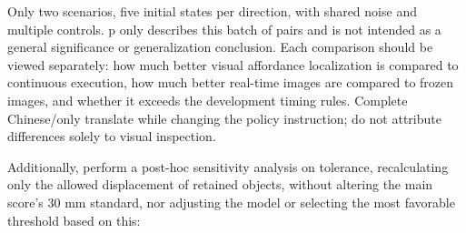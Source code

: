 Only two scenarios, five initial states per direction, with shared noise and multiple controls. p only describes this batch of pairs and is not intended as a general significance or generalization conclusion. Each comparison should be viewed separately: how much better visual affordance localization is compared to continuous execution, how much better real-time images are compared to frozen images, and whether it exceeds the development timing rules. Complete Chinese/only translate while changing the policy instruction; do not attribute differences solely to visual inspection.

Additionally, perform a post-hoc sensitivity analysis on tolerance, recalculating only the allowed displacement of retained objects, without altering the main score's 30 mm standard, nor adjusting the model or selecting the most favorable threshold based on this:

